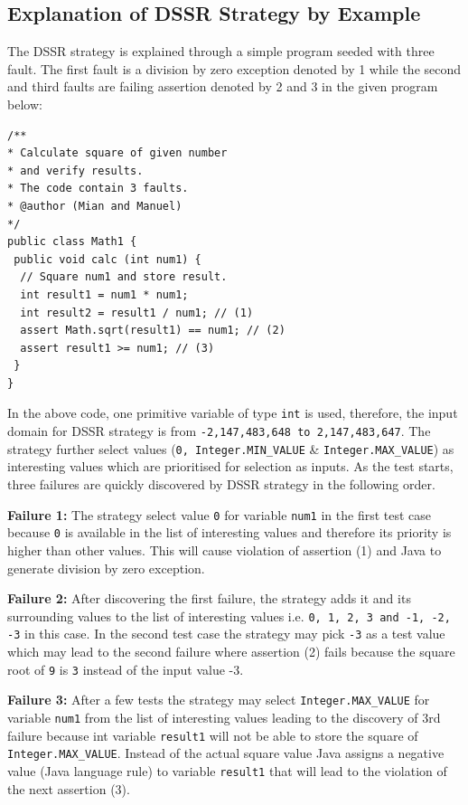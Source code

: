 

\subsection{Explanation of DSSR Strategy by Example}
The DSSR strategy is explained through a simple program seeded with three fault. The first fault is a division by zero exception denoted by 1 while the second and third faults are failing assertion denoted by 2 and 3 in the given program below: 

\begin{lstlisting}
/** 
* Calculate square of given number 
* and verify results. 
* The code contain 3 faults.
* @author (Mian and Manuel)
*/
public class Math1 {
 public void calc (int num1) {
  // Square num1 and store result. 
  int result1 = num1 * num1;
  int result2 = result1 / num1; // (1)
  assert Math.sqrt(result1) == num1; // (2)
  assert result1 >= num1; // (3)
 } 
}
\end{lstlisting}

In the above code, one primitive variable of type \verb+int+ is used, therefore, the input domain for DSSR strategy is from \verb+-2,147,483,648 to 2,147,483,647+. The strategy further select values (\verb+0, Integer.MIN_VALUE+ \& \verb+Integer.MAX_VALUE+) as interesting values which are prioritised for selection as inputs. 
As the test starts, three failures are quickly discovered by DSSR strategy in the following order.

\indent \textbf{Failure 1:} The strategy select value \verb+0+ for variable \verb+num1+  in the first test case because \verb+0+ is available in the list of interesting values and therefore its priority is higher than other values. This will cause violation of assertion (1) and Java to generate division by zero exception.

\indent \textbf{Failure 2:} After discovering the first failure, the strategy adds it and its surrounding values to the list of interesting values i.e. \verb+0, 1, 2, 3 and -1, -2, -3+ in this case. In the second test case the strategy may pick \verb+-3+ as a test value which may lead to the second failure where assertion (2) fails because the square root of \verb+9+ is \verb+3+ instead of the input value -3.

\indent \textbf{Failure 3:} After a few tests the strategy may select \verb+Integer.MAX_VALUE+ for variable \verb+num1+  from the list of interesting values leading to the discovery of 3rd failure because int variable \verb+result1+ will not be able to store the square of \verb+Integer.MAX_VALUE+. Instead of the actual square value Java assigns a negative value (Java language rule) to variable \verb+result1+ that will lead to the violation of the next assertion (3).

